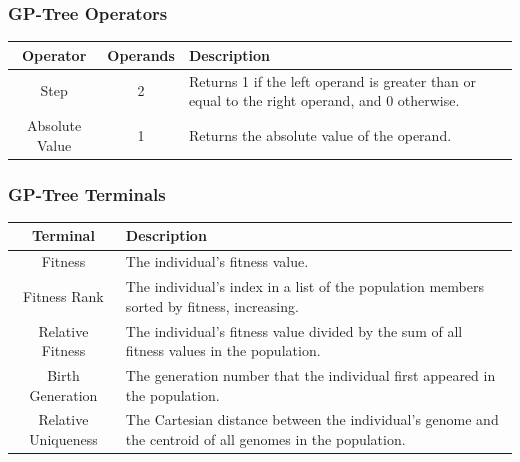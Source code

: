 \documentclass{beamer}
\begin{document}
\begin{frame}
\frametitle{GP-Tree Operators}
\begin{table}
	\centering
	\label{tab:gp-operators}
	\small
	\begin{tabular}{cc|p{6cm}}
		\hline
		Operator & Operands & Description\\
		\hline
		Step & 2 & Returns 1 if the left operand is greater than or equal to the right operand, and 0 otherwise.\\
		\hline
		Absolute Value & 1 & Returns the absolute value of the operand.\\    
		
		\hline
	\end{tabular}
\end{table}
\end{frame}
	
\begin{frame}
\frametitle{GP-Tree Terminals}

\begin{table}
	\centering
	\label{tab:gp-terminals}
	\begin{tabular}{c|p{6cm}}
		\hline
		Terminal & Description\\
		\hline
		Fitness &  The individual's fitness value. \\
		\hline
		Fitness Rank &  The individual's index in a list of the population members sorted by fitness, increasing. \\    
		\hline
		Relative Fitness &  The individual's fitness value divided by the sum of all fitness values in the population. \\
		\hline
		Birth Generation &  The generation number that the individual first appeared in the population. \\    
		\hline
		Relative Uniqueness &  The Cartesian distance between the individual's genome and the centroid of all genomes in the population. \\             
		\hline
		\end{tabular}
\end{table}
\end{frame}	
	
\end{document}
